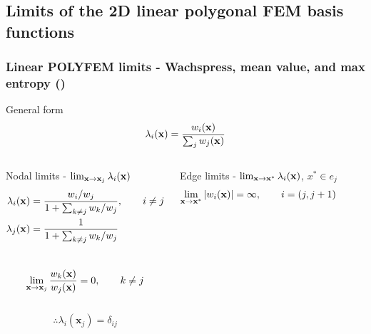 \documentclass[compress,10pt]{beamer}
\renewcommand{\vec}[1]{\mathbf{#1}}
\begin{document}
\subsection{Limits of the 2D linear polygonal FEM basis functions}
\begin{frame}[t,label=poly_limits]\frametitle{\small Linear POLYFEM limits - Wachspress, mean value, and max entropy (\hyperlink{2D_poly<1>}{})}
\begin{block}{General form}
\begin{equation*}
\lambda_i (\vec{x}) = \frac{w_i (\vec{x})}{\sum\displaylimits_j w_j (\vec{x})}
\end{equation*}
\end{block}
\begin{columns}
\begin{block}{\small Nodal limits - $\lim\displaylimits_{\vec{x} \rightarrow \vec{x}_j} \lambda_i (\vec{x}) $}
\begin{equation*}
\begin{aligned}
\lambda_i (\vec{x}) &= \frac{w_i / w_j}{1+ \sum\displaylimits_{k \neq j} w_k / w_j}, \qquad i \neq j \\
\lambda_j (\vec{x}) &= \frac{1}{1+ \sum\displaylimits_{k \neq j} w_k / w_j}
\end{aligned}
\end{equation*} \\ \vspace{2mm}
\begin{equation*}
\lim\displaylimits_{\vec{x} \rightarrow \vec{x}_j} \frac{w_k (\vec{x})}{w_j (\vec{x})} = 0, \qquad k \neq j
\end{equation*}\\ \vspace{2mm}
\begin{equation*}
\therefore \lambda_i (\vec{x}_j) = \delta_{ij}
\end{equation*}
\end{block}
\vspace{-5mm}
\begin{block}{\small Edge limits - $\lim\displaylimits_{\vec{x} \rightarrow \vec{x}^*} \lambda_i (\vec{x})$, $x^* \in  e_j$}{
\begin{equation*}
\begin{aligned}
\lim\displaylimits_{\vec{x} \rightarrow \vec{x}^*} \left|  w_i (\vec{x})  \right| &= \infty , \qquad i = (j,j+1) \\

\end{aligned}
\end{equation*}}
\end{block}
\end{columns}
\end{frame}
\end{document}
